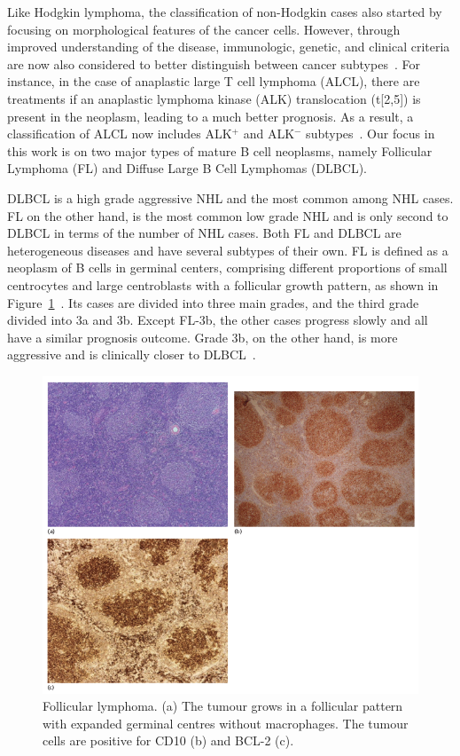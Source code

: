 Like Hodgkin lymphoma, the classification of non-Hodgkin cases also started by focusing on morphological features of the cancer cells. However, through improved understanding of the disease, immunologic, genetic, and clinical criteria are now also considered to better distinguish between cancer subtypes~\cite[Ch. 33]{hoffbrand2016postgraduate}. For instance, in the case of anaplastic large T cell lymphoma (ALCL), there are treatments if an anaplastic lymphoma kinase (ALK) translocation (t[2,5]) is present in the neoplasm, leading to a much better prognosis. As a result, a classification of ALCL now includes ALK$^+$ and ALK$^-$ subtypes~\cite[Ch. 29]{mendelsohn2014molecular}.
Our focus in this work is on two major types of mature B cell neoplasms, namely Follicular Lymphoma (FL) and Diffuse Large B Cell Lymphomas (DLBCL).

DLBCL is a high grade aggressive NHL and the most common among NHL cases. FL on the other hand, is the most common low grade NHL and is only second to DLBCL in terms of the number of NHL cases. Both FL and DLBCL are heterogeneous diseases and have several subtypes of their own. FL is defined as a neoplasm of B cells in germinal centers, comprising different proportions of small centrocytes and large centroblasts with a follicular growth pattern, as shown in Figure~\ref{fig:bkg:fl}~\cite[Ch. 31]{hoffbrand2016postgraduate}. Its cases are divided into three main grades, and the third grade divided into 3a and 3b. Except FL-3b, the other cases progress slowly and all have a similar prognosis outcome. Grade 3b, on the other hand, is more aggressive and is clinically closer to DLBCL~\cite[Ch. 33]{hoffbrand2016postgraduate}.

\begin{figure}[!ht]
  \centering
  \includegraphics[width=1\textwidth]{figs/background/fl}
  \caption{Follicular lymphoma. (a) The tumour grows in a follicular pattern with expanded germinal centres without macrophages. The
tumour cells are positive for CD10 (b) and BCL-2 (c).\protect\footnotemark}
  \label{fig:bkg:fl}
\end{figure}

